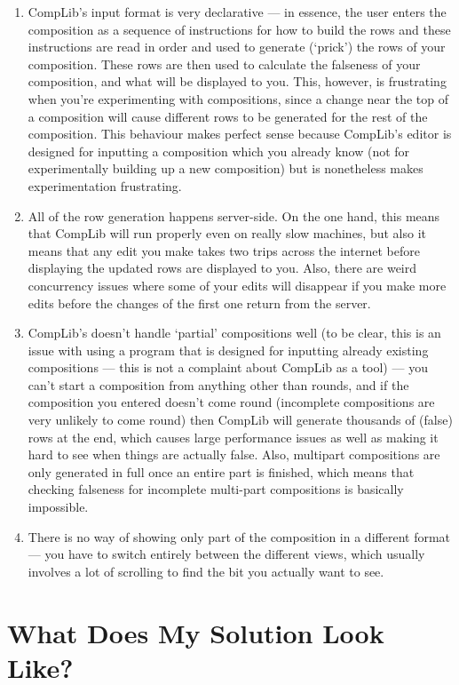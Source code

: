 \documentclass[12pt]{article}
\begin{document}
\begin{enumerate}
    \item CompLib's input format is very declarative --- in essence, the user enters the composition
        as a sequence of instructions for how to build the rows and these instructions are read
        in order and used to generate (`prick') the rows of your composition.  These rows are then
        used to calculate the falseness of your composition, and what will be displayed to you.
        This, however, is frustrating when you're experimenting with compositions, since a change
        near the top of a composition will cause different rows to be generated for the rest of the
        composition.  This behaviour makes perfect sense because CompLib's editor is designed for
        inputting a composition which you already know (not for experimentally building up a new
        composition) but is nonetheless makes experimentation frustrating.
    \item All of the row generation happens server-side.  On the one hand, this means that CompLib
        will run properly even on really slow machines, but also it means that any edit you make
        takes two trips across the internet before displaying the updated rows are displayed to you.
        Also, there are weird concurrency issues where some of your edits will disappear if you make
        more edits before the changes of the first one return from the server.
    \item CompLib's doesn't handle `partial' compositions well (to be clear, this is an issue
        with using a program that is designed for inputting already existing compositions ---
        this is not a complaint about CompLib as a tool) --- you can't start a composition from
        anything other than rounds, and if the composition you entered doesn't come round
        (incomplete compositions are very unlikely to come round) then CompLib will generate
        thousands of (false) rows at the end, which causes large performance issues as well as
        making it hard to see when things are actually false.  Also, multipart compositions are only
        generated in full once an entire part is finished, which means that checking falseness for
        incomplete multi-part compositions is basically impossible.
    \item There is no way of showing only part of the composition in a different format --- you have
        to switch entirely between the different views, which usually involves a lot of scrolling to
        find the bit you actually want to see.
\end{enumerate}

\section{What Does My Solution Look Like?}
\end{document}
